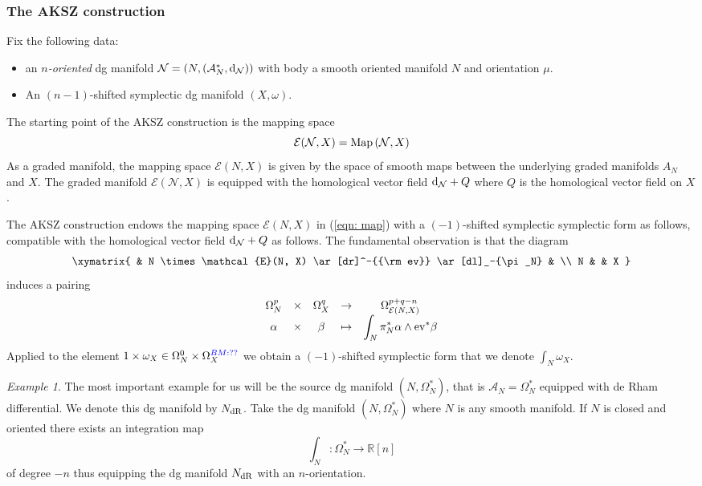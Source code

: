 \documentclass{article}
\newcommand{\RR}{\mathbb{R}}
\newcommand{\cE}{\mathcal{E}}
\newcommand{\cN}{\mathcal{N}}
\def\sA{\mathcal{A}}
\def\d{{\rm d}}
\theoremstyle{definition}
\theoremstyle{remark}
\newtheorem{Ex}[theorem]{Example}
\def\brian{\textcolor{blue}{BM: }\textcolor{blue}}
\begin{document}
\subsubsection{The AKSZ construction}

Fix the following data:
\begin{itemize}
\item an {\em $n$-oriented} dg manifold $\cN = (N, (\sA^*_N, \d_\cN))$ with body a smooth oriented manifold $N$ and orientation $\mu$. 
\item An $(n-1)$-shifted symplectic dg manifold $(X,\omega)$. 
\end{itemize}

The starting point of the AKSZ construction is the mapping space
\begin{equation}\label{eqn: map}
\cE (\cN, X) = {\rm Map}\left(\cN, X\right)
\end{equation}
As a graded manifold, the mapping space $\cE(N,X)$ is given by the space of smooth maps between the underlying graded manifolds $A_N$ and $X$. 
The graded manifold $\cE(\cN, X)$ is equipped with the homological vector field $\d_\cN + Q$ where $Q$ is the homological vector field on $X$. 

The AKSZ construction endows the mapping space $\cE(N, X)$ in (\ref{eqn: map}) with a $(-1)$-shifted symplectic symplectic form as follows, compatible with the homological vector field $\d_{\cN} + Q$ as follows.
The fundamental observation is that the diagram
\[
\xymatrix{
& N \times \cE(N, X) \ar[dr]^-{{\rm ev}} \ar[dl]_-{\pi_N} & \\
N & & X
}
\]
induces a pairing
\[
\begin{array}{ccccc}
 \Omega^p_N& \times & \Omega^q_X & \to & \Omega^{p+q-n}_{\cE(N, X)} \\
\displaystyle \alpha & \times & \beta & \mapsto & \displaystyle \int_N \pi_N^* \alpha \wedge {\rm ev}^* \beta 
 \end{array}
 \]
Applied to the element $1 \times \omega_X \in \Omega^0_N \times \Omega^{\brian{??}}_X$ we obtain a $(-1)$-shifted symplectic form that we denote $\int_N \omega_X$.

\begin{Ex}
The most important example for us will be the source dg manifold $(N, \Omega^*_N)$, that is $\sA_N = \Omega^*_N$ equipped with de Rham differential. 
We denote this dg manifold by $N_{\rm dR}$.
Take the dg manifold $(N, \Omega^*_N)$ where $N$ is any smooth manifold. 
If $N$ is closed and oriented there exists an integration map
\[
\int_N : \Omega^*_N \to \RR[n]
\]
of degree $-n$ thus equipping the dg manifold $N_{\rm dR}$ with an $n$-orientation. 
\end{Ex}
\end{document}
